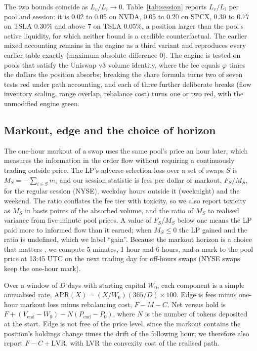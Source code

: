 \documentclass[11pt]{article}
\begin{document}
The two bounds coincide as $L_v/L_i \to 0$. Table~\ref{tab:session} reports $L_v/L_i$ per pool and session: it is 0.02 to 0.05 on NVDA, 0.05 to 0.20 on SPCX, 0.30 to 0.77 on TSLA 0.30\% and above 7 on TSLA 0.05\%, a position larger than the pool's active liquidity, for which neither bound is a credible counterfactual. The earlier mixed accounting remains in the engine as a third variant and reproduces every earlier table exactly (maximum absolute difference 0). The engine is tested on pools that satisfy the Uniswap v3 volume identity, where the fee equals $\varphi$ times the dollars the position absorbs; breaking the share formula turns two of seven tests red under path accounting, and each of three further deliberate breaks (flow inventory scaling, range overlap, rebalance cost) turns one or two red, with the unmodified engine green.

\subsection{Markout, edge and the choice of horizon}

The one-hour markout of a swap uses the same pool's price an hour later, which measures the information in the order flow without requiring a continuously trading outside price. The LP's adverse-selection loss over a set of swaps $S$ is $M_S = -\sum_{i\in S} m_i$ and our session statistic is fees per dollar of markout, $F_S/M_S$, for the regular session (NYSE), weekday hours outside it (weeknight) and the weekend. The ratio conflates the fee tier with toxicity, so we also report toxicity as $M_S$ in basis points of the absorbed volume, and the ratio of $M_S$ to realised variance from five-minute pool prices. A value of $F_S/M_S$ below one means the LP paid more to informed flow than it earned; when $M_S \leq 0$ the LP gained and the ratio is undefined, which we label ``gain''. Because the markout horizon is a choice that matters \citep{bessembinder2003issues}, we compute 5 minutes, 1 hour and 6 hours, and a mark to the pool price at 13:45 UTC on the next trading day for off-hours swaps (NYSE swaps keep the one-hour mark).

Over a window of $D$ days with starting capital $W_0$, each component is a simple annualised rate, $\mathrm{APR}(X) = (X/W_0)(365/D)\times 100$. Edge is fees minus one-hour markout loss minus rebalancing cost, $F - M - C$. Net versus hold is $F + (V_{\mathrm{end}} - W_0) - N(P_{\mathrm{end}} - P_0)$, where $N$ is the number of tokens deposited at the start. Edge is not free of the price level, since the markout contains the position's holdings change times the drift of the following hour; we therefore also report $F - C + \mathrm{LVR}$, with LVR the convexity cost of the realised path.
\end{document}
